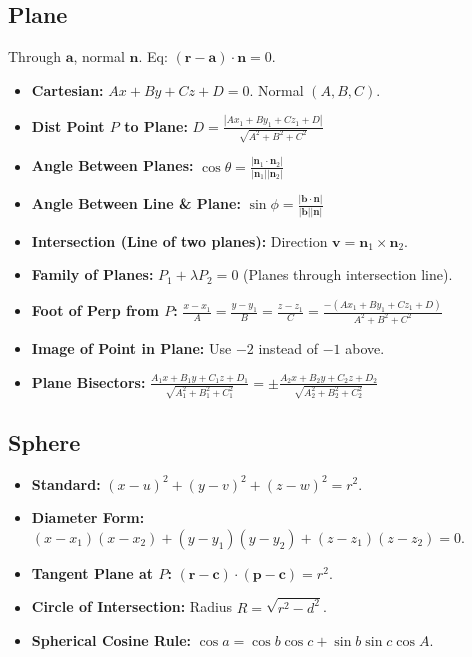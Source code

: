 \subsection{Plane}
Through $\mathbf{a}$, normal $\mathbf{n}$. Eq: $(\mathbf{r} - \mathbf{a}) \cdot \mathbf{n} = 0$.
\begin{itemize}[leftmargin=*]
    \item \textbf{Cartesian:} $Ax + By + Cz + D = 0$. Normal $(A, B, C)$.
    \item \textbf{Dist Point $P$ to Plane:} $D = \frac{|Ax_1 + By_1 + Cz_1 + D|}{\sqrt{A^2+B^2+C^2}}$
    \item \textbf{Angle Between Planes:} $\cos \theta = \frac{|\mathbf{n}_1 \cdot \mathbf{n}_2|}{|\mathbf{n}_1||\mathbf{n}_2|}$
    \item \textbf{Angle Between Line \& Plane:} $\sin \phi = \frac{|\mathbf{b} \cdot \mathbf{n}|}{|\mathbf{b}||\mathbf{n}|}$
    \item \textbf{Intersection (Line of two planes):} Direction $\mathbf{v} = \mathbf{n}_1 \times \mathbf{n}_2$.
    \item \textbf{Family of Planes:} $P_1 + \lambda P_2 = 0$ (Planes through intersection line).
    \item \textbf{Foot of Perp from $P$:} $\frac{x-x_1}{A} = \frac{y-y_1}{B} = \frac{z-z_1}{C} = \frac{-(Ax_1+By_1+Cz_1+D)}{A^2+B^2+C^2}$
    \item \textbf{Image of Point in Plane:} Use $-2$ instead of $-1$ above.
    \item \textbf{Plane Bisectors:} $\frac{A_1x+B_1y+C_1z+D_1}{\sqrt{A_1^2+B_1^2+C_1^2}} = \pm \frac{A_2x+B_2y+C_2z+D_2}{\sqrt{A_2^2+B_2^2+C_2^2}}$
\end{itemize}
\subsection{Sphere}
\begin{itemize}[leftmargin=*]
    \item \textbf{Standard:} $(x-u)^2 + (y-v)^2 + (z-w)^2 = r^2$.
    \item \textbf{Diameter Form:} $(x-x_1)(x-x_2) + (y-y_1)(y-y_2) + (z-z_1)(z-z_2) = 0$.
    \item \textbf{Tangent Plane at $P$:} $(\mathbf{r}-\mathbf{c}) \cdot (\mathbf{p}-\mathbf{c}) = r^2$.
    \item \textbf{Circle of Intersection:} Radius $R = \sqrt{r^2 - d^2}$.
    \item \textbf{Spherical Cosine Rule:} $\cos a = \cos b \cos c + \sin b \sin c \cos A$.
\end{itemize}
